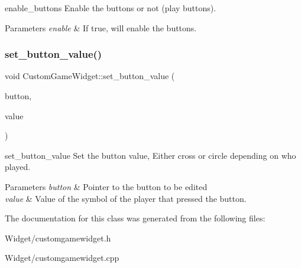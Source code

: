 enable\+\_\+buttons Enable the buttons or not (play buttons). 


\begin{DoxyParams}{Parameters}
{\em enable} & If true, will enable the buttons. \\
\hline
\end{DoxyParams}
\mbox{\label{class_custom_game_widget_ae34e750a94a537ee435aa31311b5f495}} 
\subsubsection{\texorpdfstring{set\+\_\+button\+\_\+value()}{set\_button\_value()}}
{\footnotesize\ttfamily void Custom\+Game\+Widget\+::set\+\_\+button\+\_\+value (\begin{DoxyParamCaption}\item[{class Q\+Push\+Button $\ast$}]{button,  }\item[{int}]{value }\end{DoxyParamCaption})}



set\+\_\+button\+\_\+value Set the button value, Either cross or circle depending on who played. 


\begin{DoxyParams}{Parameters}
{\em button} & Pointer to the button to be edited \\
\hline
{\em value} & Value of the symbol of the player that pressed the button. \\
\hline
\end{DoxyParams}


The documentation for this class was generated from the following files\+:\begin{DoxyCompactItemize}
\item 
Widget/customgamewidget.\+h\item 
Widget/customgamewidget.\+cpp\end{DoxyCompactItemize}

